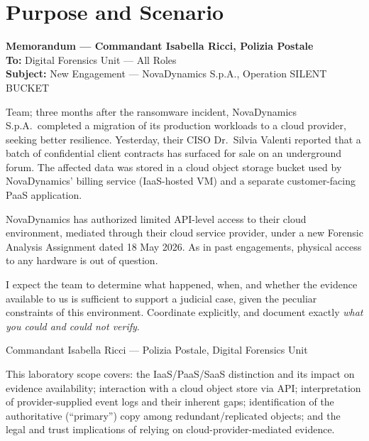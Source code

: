 \section{Purpose and Scenario}

\begin{memobox}
\textbf{Memorandum --- Commandant Isabella Ricci, Polizia Postale}\\
\textbf{To:} Digital Forensics Unit --- All Roles\\
\textbf{Subject:} New Engagement --- NovaDynamics S.p.A., Operation SILENT BUCKET

\vspace{0.3cm}
Team; three months after the ransomware incident, NovaDynamics S.p.A.\ completed a
migration of its production workloads to a cloud provider, seeking better resilience.
Yesterday, their CISO Dr.\ Silvia Valenti reported that a batch of confidential client
contracts has surfaced for sale on an underground forum. The affected data was stored in
a cloud object storage bucket used by NovaDynamics' billing service (IaaS-hosted VM) and
a separate customer-facing PaaS application.

\vspace{0.2cm}
NovaDynamics has authorized limited API-level access to their cloud environment, mediated
through their cloud service provider, under a new Forensic Analysis Assignment dated 18
May 2026. As in past engagements, physical access to any hardware is out of question.

\vspace{0.2cm}
I expect the team to determine what happened, when, and whether the evidence available to
us is sufficient to support a judicial case, given the peculiar constraints of this
environment. Coordinate explicitly, and  document exactly
\emph{what you could and could not verify}.

\vspace{0.2cm}
\hfill Commandant Isabella Ricci --- Polizia Postale, Digital Forensics Unit
\end{memobox}

\noindent
This laboratory scope covers: the IaaS/PaaS/SaaS distinction and its impact on evidence availability; interaction with a cloud object store via API; interpretation of provider-supplied event logs and their inherent gaps; identification of the authoritative
(``primary'') copy among redundant/replicated objects; and the legal and trust implications of relying on cloud-provider-mediated evidence.

